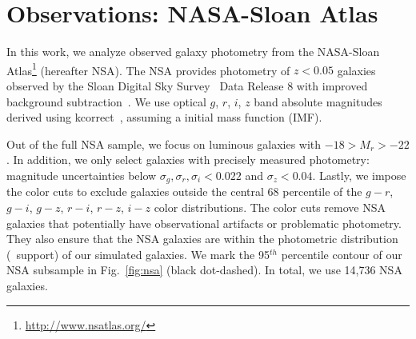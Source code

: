 \section{Observations: NASA-Sloan Atlas}  \label{sec:nsa}
In this work, we analyze observed galaxy photometry from the NASA-Sloan
Atlas\footnote{\url{http://www.nsatlas.org/}} (hereafter NSA).
The NSA provides photometry of $z < 0.05$ galaxies observed by the Sloan
Digital Sky Survey~\citep[SDSS;][]{aihara2011} Data Release 8 with improved
background subtraction~\citep{blanton2011}. 
We use optical $g$, $r$, $i$, $z$ band absolute magnitudes derived using 
{\sc kcorrect}~\citep{blanton2007}, assuming a
\cite{chabrier2003} initial mass function (IMF). 

Out of the full NSA sample, we focus on luminous galaxies with 
$-18 > M_r > -22$.
In addition, we only select galaxies with precisely measured photometry: 
magnitude uncertainties below $\sigma_g, \sigma_r, \sigma_i < 0.022$ and 
$\sigma_z < 0.04$. 
Lastly, we impose the color cuts to exclude galaxies outside the central 68
percentile of the $g-r$, $g-i$, $g-z$, $r-i$, $r-z$, $i-z$ color
distributions.
The color cuts remove NSA galaxies that potentially have observational
artifacts or problematic photometry.
They also ensure that the NSA galaxies are within the photometric distribution
(\ie~support) of our simulated galaxies.
We mark the 95$^{th}$ percentile contour of our NSA subsample in
Fig.~\ref{fig:nsa} (black dot-dashed).
In total, we use 14,736 NSA galaxies.


